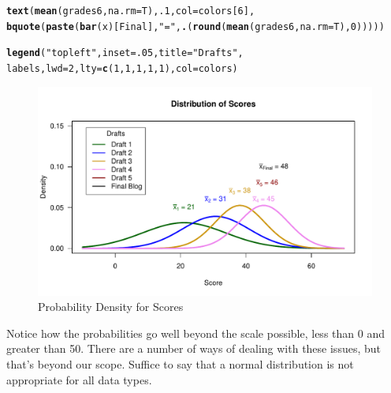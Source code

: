 \documentclass{article}\usepackage[]{graphicx}\usepackage[]{color}
\makeatletter
\def\maxwidth{ %
  \ifdim\Gin@nat@width>\linewidth
    \linewidth
  \else
    \Gin@nat@width
  \fi
}
\newcommand{\hlnum}[1]{\textcolor[rgb]{0.686,0.059,0.569}{#1}}%
\newcommand{\hlstr}[1]{\textcolor[rgb]{0.192,0.494,0.8}{#1}}%
\newcommand{\hlstd}[1]{\textcolor[rgb]{0.345,0.345,0.345}{#1}}%
\newcommand{\hlkwc}[1]{\textcolor[rgb]{0.333,0.667,0.333}{#1}}%
\newcommand{\hlkwd}[1]{\textcolor[rgb]{0.737,0.353,0.396}{\textbf{#1}}}%
\newenvironment{kframe}{%
 \def\at@end@of@kframe{}%
 \ifinner\ifhmode%
  \def\at@end@of@kframe{\end{minipage}}%
  \begin{minipage}{\columnwidth}%
 \fi\fi%
 \def\FrameCommand##1{\hskip\@totalleftmargin \hskip-\fboxsep
 \colorbox{shadecolor}{##1}\hskip-\fboxsep
     \hskip-\linewidth \hskip-\@totalleftmargin \hskip\columnwidth}%
 \MakeFramed {\advance\hsize-\width
   \@totalleftmargin\z@ \linewidth\hsize
   \@setminipage}}%
 {\par\unskip\endMakeFramed%
 \at@end@of@kframe}
\newenvironment{knitrout}{}{} %
\makeatother
\begin{document}
\begin{knitrout}
\begin{kframe}
\begin{alltt}
\hlkwd{text}\hlstd{(}\hlkwd{mean}\hlstd{(grades6,} \hlkwc{na.rm}\hlstd{=T),} \hlnum{.1}\hlstd{,} \hlkwc{col}\hlstd{=colors[}\hlnum{6}\hlstd{],}
     \hlkwd{bquote}\hlstd{(}\hlkwd{paste}\hlstd{(}\hlkwd{bar}\hlstd{(x)[Final],} \hlstr{" = "}\hlstd{,} \hlkwd{.}\hlstd{(}\hlkwd{round}\hlstd{(}\hlkwd{mean}\hlstd{(grades6,} \hlkwc{na.rm}\hlstd{=T),} \hlnum{0}\hlstd{)))))}

\hlkwd{legend}\hlstd{(}\hlstr{"topleft"}\hlstd{,} \hlkwc{inset}\hlstd{=}\hlnum{.05}\hlstd{,} \hlkwc{title}\hlstd{=}\hlstr{"Drafts"}\hlstd{,}
  \hlstd{labels,} \hlkwc{lwd}\hlstd{=}\hlnum{2}\hlstd{,} \hlkwc{lty}\hlstd{=}\hlkwd{c}\hlstd{(}\hlnum{1}\hlstd{,} \hlnum{1}\hlstd{,} \hlnum{1}\hlstd{,} \hlnum{1}\hlstd{,} \hlnum{1}\hlstd{),} \hlkwc{col}\hlstd{=colors)}
\end{alltt}
\end{kframe}\begin{figure}
\includegraphics[width=\maxwidth]{figure/scoresdensity-1} \caption[Probability Density for Scores]{Probability Density for Scores}\label{fig:scoresdensity}
\end{figure}


\end{knitrout}

Notice how the probabilities go well beyond the scale possible, less than 0 and greater than 50. There are a number of ways of dealing with these issues, but that's beyond our scope. Suffice to say that a normal distribution is not appropriate for all data types. 
\end{document}
